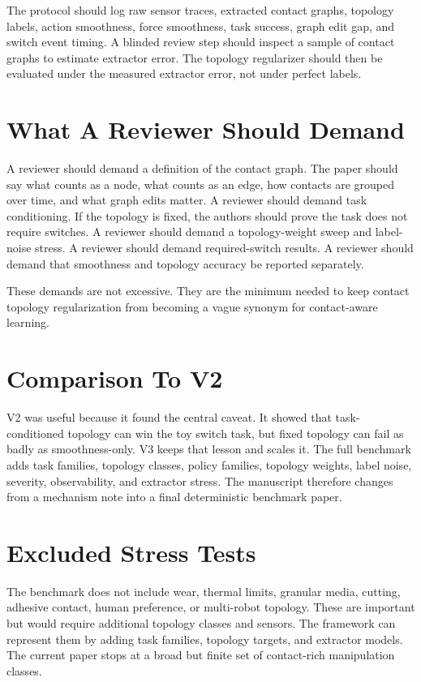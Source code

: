 \documentclass{article}
\begin{document}
The protocol should log raw sensor traces, extracted contact graphs, topology labels, action smoothness, force smoothness, task success, graph edit gap, and switch event timing. A blinded review step should inspect a sample of contact graphs to estimate extractor error. The topology regularizer should then be evaluated under the measured extractor error, not under perfect labels.

\section{What A Reviewer Should Demand}

A reviewer should demand a definition of the contact graph. The paper should say what counts as a node, what counts as an edge, how contacts are grouped over time, and what graph edits matter. A reviewer should demand task conditioning. If the topology is fixed, the authors should prove the task does not require switches. A reviewer should demand a topology-weight sweep and label-noise stress. A reviewer should demand required-switch results. A reviewer should demand that smoothness and topology accuracy be reported separately.

These demands are not excessive. They are the minimum needed to keep contact topology regularization from becoming a vague synonym for contact-aware learning.

\section{Comparison To V2}

V2 was useful because it found the central caveat. It showed that task-conditioned topology can win the toy switch task, but fixed topology can fail as badly as smoothness-only. V3 keeps that lesson and scales it. The full benchmark adds task families, topology classes, policy families, topology weights, label noise, severity, observability, and extractor stress. The manuscript therefore changes from a mechanism note into a final deterministic benchmark paper.

\section{Excluded Stress Tests}

The benchmark does not include wear, thermal limits, granular media, cutting, adhesive contact, human preference, or multi-robot topology. These are important but would require additional topology classes and sensors. The framework can represent them by adding task families, topology targets, and extractor models. The current paper stops at a broad but finite set of contact-rich manipulation classes.
\end{document}
